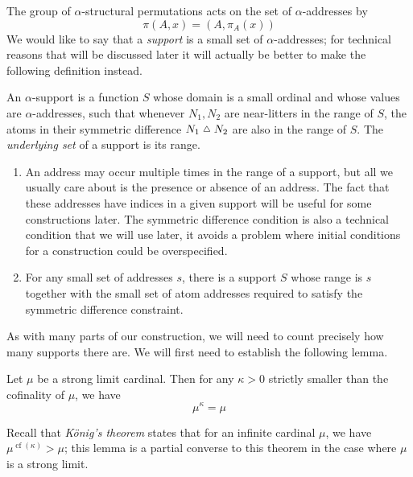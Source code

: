 The group of \( \alpha \)-structural permutations acts on the set of \( \alpha \)-addresses by
\[ \pi(A, x) = (A, \pi_A(x)) \]
We would like to say that a \emph{support} is a small set of \( \alpha \)-addresses; for technical reasons that will be discussed later it will actually be better to make the following definition instead.
\begin{definition}
    An \( \alpha \)-support is a function \( S \) whose domain is a small ordinal and whose values are \( \alpha \)-addresses, such that whenever \( N_1, N_2 \) are near-litters in the range of \( S \), the atoms in their symmetric difference \( N_1 \symmdiff N_2 \) are also in the range of \( S \).
    The \emph{underlying set} of a support is its range.
\end{definition}
\begin{remarks}\mbox{\negthinspace}
    \begin{enumerate}
        \item An address may occur multiple times in the range of a support, but all we usually care about is the presence or absence of an address.
        The fact that these addresses have indices in a given support will be useful for some constructions later.
        The symmetric difference condition is also a technical condition that we will use later, it avoids a problem where initial conditions for a construction could be overspecified.
        \item For any small set of addresses \( s \), there is a support \( S \) whose range is \( s \) together with the small set of atom addresses required to satisfy the symmetric difference constraint.
    \end{enumerate}
\end{remarks}
As with many parts of our construction, we will need to count precisely how many supports there are.
We will first need to establish the following lemma.
\begin{lemma}
    \label{lem:konig_converse}
    Let \( \mu \) be a strong limit cardinal.
    Then for any \( \kappa > 0 \) strictly smaller than the cofinality of \( \mu \), we have
    \[ \mu^\kappa = \mu \]
\end{lemma}
Recall that \emph{König's theorem} states that for an infinite cardinal \( \mu \), we have \( \mu^{\operatorname{cf}(\kappa)} > \mu \); this lemma is a partial converse to this theorem in the case where \( \mu \) is a strong limit.
